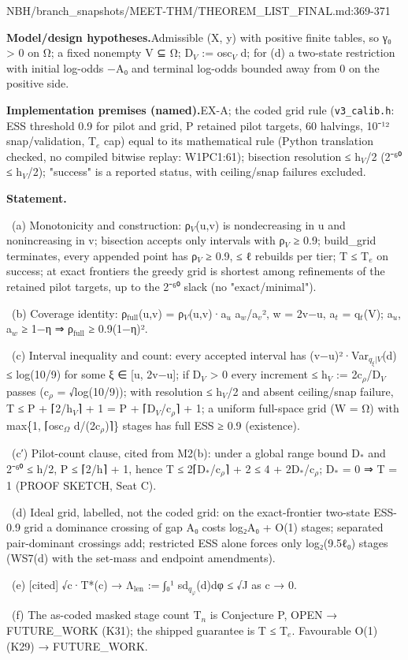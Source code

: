 \begin{stmt}{NBH/branch_snapshots/MEET-THM/THEOREM_LIST_FINAL.md:369-371}
\par\smallskip\noindent\textbf{Model/design hypotheses.}\enspace Admissible (X, y) with positive finite tables, so γ₀ \textgreater{} 0 on Ω; a fixed nonempty V ⊆ Ω; D$_{V}$ := osc$_{V}$ d; for (d) a two-state restriction with initial log-odds −A₀ and terminal log-odds bounded away from 0 on the positive side.
\par\smallskip\noindent\textbf{Implementation premises (named).}\enspace EX-A; the coded grid rule (\texttt{v3\_calib.h}: ESS threshold 0.9 for pilot and grid, P retained pilot targets, 60 halvings, 10⁻¹² snap/validation, T$_{e}$ cap) equal to its mathematical rule (Python translation checked, no compiled bitwise replay: W1PC1:61); bisection resolution ≤ h$_{V}$/2 (2⁻⁶⁰ ≤ h$_{V}$/2); "success" is a reported status, with ceiling/snap failures excluded.
\par\smallskip\noindent\textbf{Statement.}\enspace \par {}\ (a) Monotonicity and construction: ρ$_{V}$(u,v) is nondecreasing in u and nonincreasing in v; bisection accepts only intervals with ρ$_{V}$ ≥ 0.9; build\_grid terminates, every appended point has ρ$_{V}$ ≥ 0.9, ≤ ℓ rebuilds per tier; T ≤ T$_{e}$ on success; at exact frontiers the greedy grid is shortest among refinements of the retained pilot targets, up to the 2⁻⁶⁰ slack (no "exact/minimal"). \par {}\ (b) Coverage identity: ρ$_{\mathrm{full}}$(u,v) = ρ$_{V}$(u,v)·a$_{u}$ a$_{w}$/a$_{v}$², w = 2v−u, a$_{t}$ = q$_{t}$(V); a$_{u}$, a$_{w}$ ≥ 1−η ⇒ ρ$_{\mathrm{full}}$ ≥ 0.9(1−η)². \par {}\ (c) Interval inequality and count: every accepted interval has (v−u)²·Var$_{q_{ξ}|V}$(d) ≤ log(10/9) for some ξ ∈ [u, 2v−u]; if D$_{V}$ \textgreater{} 0 every increment ≤ h$_{V}$ := 2c$_{ρ}$/D$_{V}$ passes (c$_{ρ}$ = √log(10/9)); with resolution ≤ h$_{V}$/2 and absent ceiling/snap failure, T ≤ P + ⌈2/h$_{V}$⌉ + 1 = P + ⌈D$_{V}$/c$_{ρ}$⌉ + 1; a uniform full-space grid (W = Ω) with max\{1, ⌈osc$_{Ω}$ d/(2c$_{ρ}$)⌉\} stages has full ESS ≥ 0.9 (existence). \par {}\ (c′) Pilot-count clause, cited from M2(b): under a global range bound D$_{*}$ and 2⁻⁶⁰ ≤ h/2, P ≤ ⌈2/h⌉ + 1, hence T ≤ 2⌈D$_{*}$/c$_{ρ}$⌉ + 2 ≤ 4 + 2D$_{*}$/c$_{ρ}$; D$_{*}$ = 0 ⇒ T = 1 (PROOF SKETCH, Seat C). \par {}\ (d) Ideal grid, labelled, not the coded grid: on the exact-frontier two-state ESS-0.9 grid a dominance crossing of gap A₀ costs log₂A₀ + O(1) stages; separated pair-dominant crossings add; restricted ESS alone forces only log₂(9.5ℓ₀) stages (WS7(d) with the set-mass and endpoint amendments). \par {}\ (e) [cited] √c·T*(c) → Λ$_{\mathrm{len}}$ := ∫₀¹ sd$_{q_{φ}}$(d)dφ ≤ √J as c → 0. \par {}\ (f) The as-coded masked stage count T$_{n}$ is Conjecture P, OPEN → FUTURE\_WORK (K31); the shipped guarantee is T ≤ T$_{e}$. Favourable O(1) (K29) → FUTURE\_WORK.
\end{stmt}

